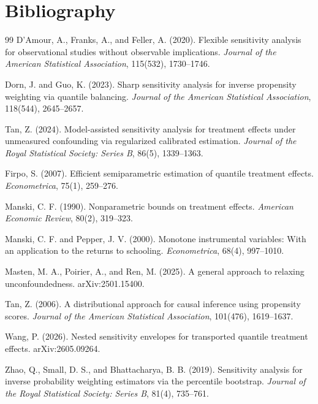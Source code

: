 \documentclass[11pt]{article}
\theoremstyle{definition}
\theoremstyle{plain}
\theoremstyle{remark}
\begin{document}
\section*{Bibliography}
\begin{thebibliography}{99}
D'Amour, A., Franks, A., and Feller, A. (2020).
Flexible sensitivity analysis for observational studies without observable implications.
\emph{Journal of the American Statistical Association}, 115(532), 1730--1746.

Dorn, J. and Guo, K. (2023).
Sharp sensitivity analysis for inverse propensity weighting via quantile balancing.
\emph{Journal of the American Statistical Association}, 118(544), 2645--2657.

Tan, Z. (2024).
Model-assisted sensitivity analysis for treatment effects under unmeasured confounding via regularized calibrated estimation.
\emph{Journal of the Royal Statistical Society: Series B}, 86(5), 1339--1363.

Firpo, S. (2007).
Efficient semiparametric estimation of quantile treatment effects.
\emph{Econometrica}, 75(1), 259--276.

Manski, C. F. (1990).
Nonparametric bounds on treatment effects.
\emph{American Economic Review}, 80(2), 319--323.

Manski, C. F. and Pepper, J. V. (2000).
Monotone instrumental variables: With an application to the returns to schooling.
\emph{Econometrica}, 68(4), 997--1010.

Masten, M. A., Poirier, A., and Ren, M. (2025).
A general approach to relaxing unconfoundedness.
arXiv:2501.15400.

Tan, Z. (2006).
A distributional approach for causal inference using propensity scores.
\emph{Journal of the American Statistical Association}, 101(476), 1619--1637.

Wang, P. (2026).
Nested sensitivity envelopes for transported quantile treatment effects.
arXiv:2605.09264.

Zhao, Q., Small, D. S., and Bhattacharya, B. B. (2019).
Sensitivity analysis for inverse probability weighting estimators via the percentile bootstrap.
\emph{Journal of the Royal Statistical Society: Series B}, 81(4), 735--761.
\end{thebibliography}
\end{document}
